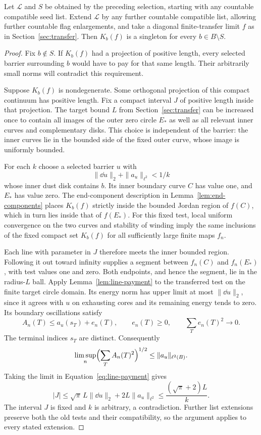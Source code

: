 \begin{theorem}
\label{thm:unmarked-collapse}
Let $\mathscr L$ and $S$ be obtained by the preceding selection,
starting with any countable compatible seed list.  Extend $\mathscr L$ by any
further countable compatible list, allowing further countable flag
enlargements, and take a diagonal finite-transfer limit $f$ as in
Section~\ref{sec:transfer}.  Then $K_b(f)$ is a singleton for every
$b\in B\setminus S$.
\end{theorem}

\begin{proof}
Fix $b\notin S$.  If $K_b(f)$ had a projection of positive length,
every selected barrier surrounding $b$ would have to pay for that same
length.  Their arbitrarily small norms will contradict this requirement.

Suppose $K_b(f)$ is nondegenerate.  Some orthogonal projection of this
compact continuum has positive length.  Fix a compact interval $J$ of
positive length inside that projection.  The target bound $L$ from
Section~\ref{sec:transfer} can be increased once to contain all images
of the outer zero circle $E_*$ as well as all relevant inner curves and
complementary disks.  This choice is independent of the barrier: the
inner curves lie in the bounded side of the fixed outer curve, whose
image is uniformly bounded.

For each $k$ choose a selected barrier $u$ with
\[
 \|\dd u\|_2+\|a_u\|_{\ell^2}<1/k
\]
whose inner dust disk contains $b$.  Its inner boundary curve $C$ has
value one, and $E_*$ has value zero.  The end-component description
in Lemma~\ref{lem:end-components} places $K_b(f)$ strictly inside the
bounded Jordan region of $f(C)$, which in turn lies inside that of
$f(E_*)$.  For this fixed test, local uniform convergence on the two
curves and stability of winding imply the same inclusions of the fixed
compact set $K_b(f)$ for all sufficiently large finite maps $f_n$.

Each line with parameter in $J$ therefore meets the inner bounded
region.  Following it out toward infinity supplies a segment between
$f_n(C)$ and $f_n(E_*)$, with test values one and zero.  Both endpoints,
and hence the segment, lie in the radius-$L$ ball.  Apply
Lemma~\ref{lem:line-payment} to the transferred test on the finite
target circle domain.  Its energy norm has upper limit at most
$\|\dd u\|_2$, since it agrees with $u$ on exhausting cores and its
remaining energy tends to zero.  Its boundary oscillations satisfy
\[
 A_n(T)\le a_u(s_T)+e_n(T),
 \qquad e_n(T)\ge0,
 \qquad \sum_Te_n(T)^2\longrightarrow0.
\]
The terminal indices $s_T$ are distinct.  Consequently
\[
 \limsup_n\Bigl(\sum_T A_n(T)^2\Bigr)^{1/2}
 \le\|a_u\|_{\ell^2(B)}.
\]
Taking the limit in Equation~\eqref{eq:line-payment} gives
\[
 |J|\le\sqrt{\pi}\,L\|\dd u\|_2+2L\|a_u\|_{\ell^2}
 \le \frac{(\sqrt{\pi}+2)L}{k}.
\]
The interval $J$ is fixed and $k$ is arbitrary, a contradiction.
Further list extensions preserve both the old tests and their
compatibility, so the argument applies to every stated extension.
\end{proof}


